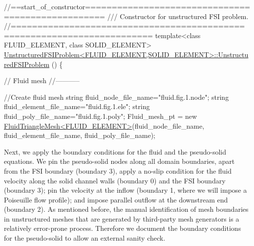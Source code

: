 \begin{DoxyCodeInclude}
\textcolor{comment}{//==start\_of\_constructor==================================================}
\textcolor{comment}{/// Constructor for unstructured FSI problem.}
\textcolor{comment}{}\textcolor{comment}{//========================================================================}
\textcolor{keyword}{template}<\textcolor{keyword}{class} FLUID\_ELEMENT, \textcolor{keyword}{class} SOLID\_ELEMENT>
\hyperlink{classUnstructuredFSIProblem_a6a31fd839e0215ef1312942cf7284bd2}{UnstructuredFSIProblem<FLUID\_ELEMENT,SOLID\_ELEMENT>::UnstructuredFSIProblem}
      ()
\{ 

 \textcolor{comment}{// Fluid mesh}
 \textcolor{comment}{//-----------}

 \textcolor{comment}{//Create fluid mesh}
 \textcolor{keywordtype}{string} fluid\_node\_file\_name=\textcolor{stringliteral}{"fluid.fig.1.node"};
 \textcolor{keywordtype}{string} fluid\_element\_file\_name=\textcolor{stringliteral}{"fluid.fig.1.ele"};
 \textcolor{keywordtype}{string} fluid\_poly\_file\_name=\textcolor{stringliteral}{"fluid.fig.1.poly"}; 
 Fluid\_mesh\_pt = \textcolor{keyword}{new} \hyperlink{classFluidTriangleMesh}{FluidTriangleMesh<FLUID\_ELEMENT>}(fluid\_node\_file\_name,
                                                      fluid\_element\_file\_name,
                                                      fluid\_poly\_file\_name);

\end{DoxyCodeInclude}


Next, we apply the boundary conditions for the fluid and the pseudo-\/solid equations. We pin the pseudo-\/solid nodes along all domain boundaries, apart from the F\+SI boundary (boundary 3), apply a no-\/slip condition for the fluid velocity along the solid channel walls (boundary 0) and the F\+SI boundary (boundary 3); pin the velocity at the inflow (boundary 1, where we will impose a Poiseuille flow profile); and impose parallel outflow at the downstream end (boundary 2). As mentioned before, the manual identification of mesh boundaries in unstructured meshes that are generated by third-\/party mesh generators is a relatively error-\/prone process. Therefore we document the boundary conditions for the pseudo-\/solid to allow an external sanity check.


